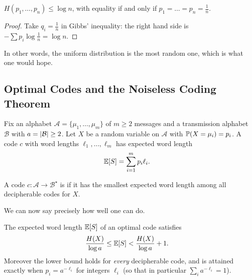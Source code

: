 \documentclass[a4paper]{scrartcl}
\newcommand{\Ac}{\mathcal{A}}
\newcommand{\Bc}{\mathcal{B}}
\begin{document}
\begin{corollary}
	$H(p_1, \dots, p_n) \le \log n$, with equality if and only if $p_1 = \dots = p_n = \frac1n$.
\end{corollary}

\begin{proof}
	Take $q_i = \frac1n$ in Gibbs' inequality: the right hand side is $-\sum p_i \log \frac1n = \log n$.
\end{proof}

In other words, the uniform distribution is the most random one, which is what one would hope.

\subsection{Optimal Codes and the Noiseless Coding Theorem}

Fix an alphabet $\Ac = \{\mu_1, \dots, \mu_m\}$ of $m \ge 2$ messages and a transmission alphabet $\Bc$ with $a = \abs{\Bc} \ge 2$. Let $X$ be a random variable on $\Ac$ with $\mathbb{P}(X = \mu_i) = p_i$. A code $c$ with word lengths $\ell_1, \dots, \ell_m$ has expected word length
$$\mathbb{E}[S] = \sum_{i=1}^m p_i \ell_i.$$

\begin{definition}
	A code $c \colon \Ac \to \Bc^\star$ is  if it has the smallest expected word length among all decipherable codes for $X$.
\end{definition}

We can now say precisely how well one can do.

\begin{theorem}\label{thm:noiseless}
	The expected word length $\mathbb{E}[S]$ of an optimal code satisfies
	$$\frac{H(X)}{\log a} \le \mathbb{E}[S] < \frac{H(X)}{\log a} + 1.$$
	Moreover the lower bound holds for \emph{every} decipherable code, and is attained exactly when $p_i = a^{-\ell_i}$ for integers $\ell_i$ (so that in particular $\sum_i a^{-\ell_i} = 1$).
\end{theorem}
\end{document}
